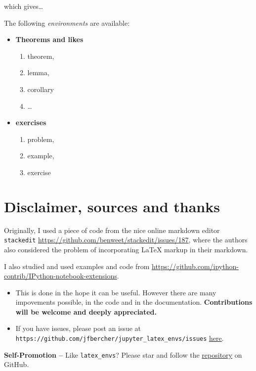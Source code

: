     which gives\ldots{}

The following \textit{environments} are available:
\begin{itemize} \item \textbf{Theorems and likes}
\begin{enumerate} \item theorem, \item lemma, \item corollary \item
\ldots{} \end{enumerate} \item \textbf{exercises}
\begin{enumerate} \item problem, \item example, \item exercise
\end{enumerate} \end{itemize}

    \section{Disclaimer, sources and
thanks}\label{disclaimer-sources-and-thanks}

    Originally, I used a piece of code from the nice online markdown editor
\texttt{stackedit}
\url{https://github.com/benweet/stackedit/issues/187}, where the authors
also considered the problem of incorporating LaTeX markup in their
markdown.

I also studied and used examples and code from
\url{https://github.com/ipython-contrib/IPython-notebook-extensions}.

\begin{itemize}
\item
  This is done in the hope it can be useful. However there are many
  impovements possible, in the code and in the documentation.
  \textbf{Contributions will be welcome and deeply appreciated.}
\item
  If you have issues, please post an issue at
  \texttt{https://github.com/jfbercher/jupyter\_latex\_envs/issues}
  \href{https://github.com/jfbercher/jupyter_latex_envs/issues}{here}.
\end{itemize}

\textbf{Self-Promotion --} Like \texttt{latex\_envs}? Please star and
follow the
\href{https://github.com/jfbercher/jupyter_latex_envs}{repository} on
GitHub.

    